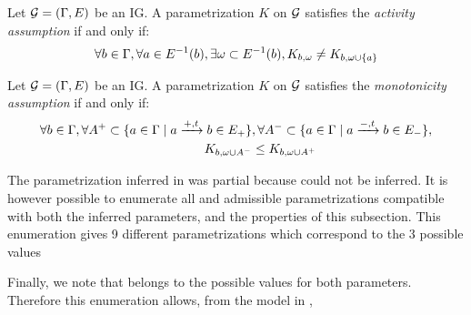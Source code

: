 \begin{property}
\label{pro:param_enum_activity}
Let $\mathcal{G} = (\Gamma, E)$ be an IG. A parametrization $K$ on $\mathcal{G}$ satisfies the \emph{activity assumption} if and only if:
\begin{align*}
  \forall b \in \Gamma, \forall a \in E^{-1}(b), \exists \omega \subset E^{-1}(b), K_{b,\omega} \neq K_{b,\omega \cup \{ a \}}
\end{align*}
\end{property}

\begin{property}
\label{pro:param_enum_monotonicity}
Let $\mathcal{G} = (\Gamma, E)$ be an IG. A parametrization $K$ on $\mathcal{G}$ satisfies the \emph{monotonicity assumption} if and only if:
\begin{align*}
  \forall b \in \Gamma,
  \forall A^+ \subset \{ a \in \Gamma \mid a \xrightarrow{+, t} b \in E_+ \}&,
  \forall A^- \subset \{ a \in \Gamma \mid a \xrightarrow{-, t} b \in E_- \},\\
  K_{b,\omega \cup A^-} & \leq K_{b,\omega \cup A^+}
\end{align*}
\end{property}

\begin{example}\label{ex:enum-param-runningPH-1}
The parametrization inferred in  was partial
because  could not be inferred.
It is however possible to enumerate all  and admissible parametrizations
compatible with both the inferred parameters, and the properties of this subsection.
This enumeration gives 9 different  parametrizations
which correspond to the 3 possible values
%

Finally, we note that  belongs to the possible values for both parameters.
Therefore this enumeration allows, from the model in ,
%
\end{example}

